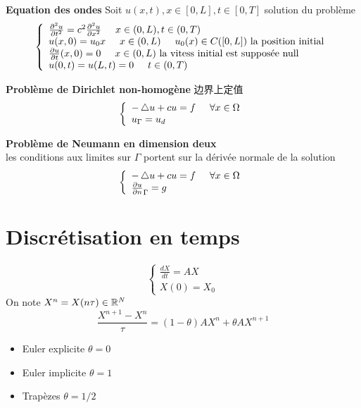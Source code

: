 \textbf{Equation des ondes}
Soit $u(x,t), x \in [0,L], t \in [0,T] $ solution du probl\`eme
\begin{equation}
\left\{
  \begin{array}{ll}
		  \frac{\partial^2  u}{\partial t^2} = c^2 \frac{\partial^2 u}{\partial x^2 } \eqspace  x \in (0,L), t \in (0,T) \\
		  u(x,0) = u_0{x} \eqspace x \in (0,L) \eqspace u_0(x)\in C([0,L])\  \text{la position initial}\\
		  \frac{\partial  u}{\partial t}(x,0) = 0 \eqspace x \in (0,L)\ \text{la vitess initial est suppos\'ee null}\\
		  u(0,t) = u(L,t) = 0 \eqspace t \in (0,T)
  \end{array}
\right.
\end{equation}
\bigskip

\textbf{Probl\`eme de Dirichlet non-homog\`ene}
边界上定值\\
\begin{equation}
\left\{
  \begin{array}{ll}
		 -\mathop{}\!\mathbin\bigtriangleup u + cu = f \hspace{0.5cm} \forall x \in \Omega \\
		 u_{\Gamma} = u_d
  \end{array}
\right.
\end{equation}
\bigskip

\textbf{Probl\`eme de Neumann en dimension deux}\\
les conditions aux limites sur $\Gamma$ portent sur la d\'eriv\'ee normale de la solution\\
\begin{equation}
\left\{
  \begin{array}{ll}
		 -\mathop{}\!\mathbin\bigtriangleup u + cu = f \hspace{0.5cm} \forall x \in \Omega \\
		 \frac{\partial u}{\partial n}_{\Gamma} = g
  \end{array}
\right.
\end{equation}
\bigskip

\section{Discr\'etisation en temps}
\begin{equation}
\left\{
  \begin{array}{ll}
		  \frac{d X}{dt} = A X \\
		  X(0) = X_0
  \end{array}
\right.
\end{equation}
On note $X^n = X(n\tau) \in \mathbb{R}^N$
$$
\frac{X^{n+1} - X^n}{\tau} = (1-\theta)AX^n + \theta A X^{n+1}
$$
\begin{itemize}
		\item Euler explicite $\theta = 0$
		\item Euler implicite $\theta = 1$
		\item Trap\`ezes $\theta = 1/2$
\end{itemize}
\bigskip

